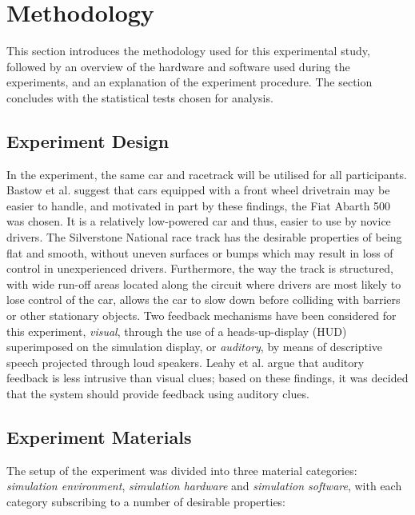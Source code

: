 \documentclass{sig-alternate}
\begin{document}
{\section{Methodology}
\label{sec:Methodology}
This section introduces the methodology used for this experimental study, followed by an overview of the hardware and software used during the experiments, and an explanation of the experiment procedure. The section concludes with the statistical tests chosen for analysis.

\subsection{Experiment Design}
In the experiment, the same car and racetrack will be utilised for all participants. Bastow et al. \cite{bastow2004car} suggest that cars equipped with a front wheel drivetrain may be easier to handle, and motivated in part by these findings, the Fiat Abarth 500 was chosen. It is a relatively low-powered car and thus, easier to use by novice drivers. The Silverstone National race track has the desirable properties of being flat and smooth, without uneven surfaces or bumps which may result in loss of control in unexperienced drivers. Furthermore, the way the track is structured, with wide run-off areas located along the circuit where drivers are most likely to lose control of the car, allows the car to slow down before colliding with barriers or other stationary objects. Two feedback mechanisms have been considered for this experiment, \emph{visual}, through the use of a heads-up-display (HUD) superimposed on the simulation display, or \emph{auditory}, by means of descriptive speech projected through loud speakers. Leahy et al. \cite{leahy2003auditory} argue that auditory feedback is less intrusive than visual clues; based on these findings, it was decided that the system should provide feedback using auditory clues.

\subsection{Experiment Materials}
The setup of the experiment was divided into three material categories: \emph{simulation environment}, \emph{simulation hardware} and \emph{simulation software}, with each category subscribing to a number of desirable properties:

}
\end{document}
